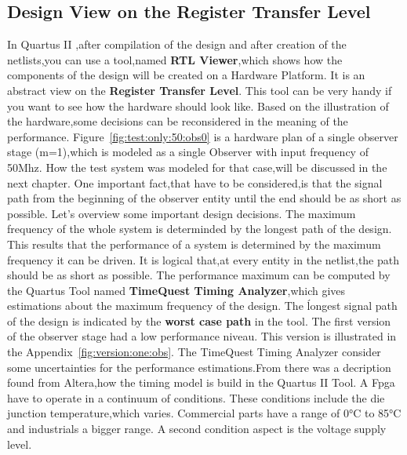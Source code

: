 \subsection{Design View on the Register Transfer Level}
In Quartus II ,after compilation of the design and after creation of the netlists,you can use a tool,named \textbf{RTL Viewer},which shows how
the components of the design will be created on a Hardware Platform. It is an abstract view on the \textbf{Register Transfer Level}.
This tool can be very handy if you want to see how the hardware should look like. Based on the illustration of the hardware,some decisions can
be reconsidered in the meaning of the performance. \newline
Figure~\ref{fig:test:only:50:obs0} is a hardware plan of a single observer stage (m=1),which is modeled as a single Observer with input frequency of 50Mhz.
How the test system was modeled for that case,will be discussed in the next chapter.
One important fact,that have to be considered,is that the signal path from the beginning of the observer entity until the end should be as short as possible.
Let's overview some important design decisions.\newline
The maximum frequency of the whole system is determinded by the longest path of the design. This results that the performance of a system is determined by the maximum frequency
it can be driven. It is logical that,at every entity in the netlist,the path should be as short as possible.
The performance maximum can be computed by the Quartus Tool named \textbf{TimeQuest Timing Analyzer},which gives estimations about the maximum frequency of the design.
The ĺongest signal path of the design is indicated by the \textbf{worst case path} in the tool. \newline
The first version of the observer stage had a low performance niveau. This version is illustrated in the Appendix~\ref{fig:version:one:obs}.
The TimeQuest Timing Analyzer consider some uncertainties for the performance estimations.From \cite{altera2} there was a decription found from Altera,how the timing model is 
build in the Quartus II Tool. 
A Fpga have to operate in a continuum of conditions. These conditions include the die junction temperature,which varies.
Commercial parts have a range of 0°C to 85°C and industrials a bigger range. 
A second condition aspect is the voltage supply level.



